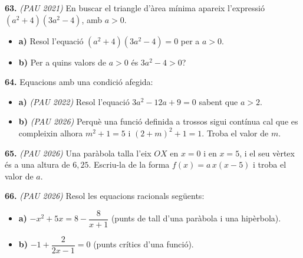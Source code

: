 \documentclass[13pt,a4paper]{extarticle}
\begin{document}
\par\noindent\begin{minipage}{\linewidth}
\textbf{63.} \emph{(PAU 2021)} En buscar el triangle d'àrea mínima apareix l'expressió $(a^2+4)(3a^2-4)$, amb $a>0$.\par

\begin{itemize}[leftmargin=0pt,itemsep=6pt,topsep=4pt,parsep=0pt,label={}]
\item \textbf{a)} Resol l'equació $(a^2+4)(3a^2-4)=0$ per a $a>0$.
\item \textbf{b)} Per a quins valors de $a>0$ és $3a^2-4>0$?
\end{itemize}
\end{minipage}\par\vspace{1.6mm}
\par\noindent\begin{minipage}{\linewidth}
\textbf{64.} Equacions amb una condició afegida:\par

\begin{itemize}[leftmargin=0pt,itemsep=6pt,topsep=4pt,parsep=0pt,label={}]
\item \textbf{a)} \emph{(PAU 2022)} Resol l'equació $3a^2-12a+9=0$ sabent que $a>2$.
\item \textbf{b)} \emph{(PAU 2026)} Perquè una funció definida a trossos sigui contínua cal que es compleixin alhora $m^2+1=5$ i $(2+m)^2+1=1$. Troba el valor de $m$.
\end{itemize}
\end{minipage}\par\vspace{1.6mm}
\par\noindent\begin{minipage}{\linewidth}
\textbf{65.} \emph{(PAU 2026)} Una paràbola talla l'eix $OX$ en $x=0$ i en $x=5$, i el seu vèrtex és a una altura de $6{,}25$. Escriu-la de la forma $f(x)=a\,x(x-5)$ i troba el valor de $a$.\par
\end{minipage}\par\vspace{1.6mm}
\par\noindent\begin{minipage}{\linewidth}
\textbf{66.} \emph{(PAU 2026)} Resol les equacions racionals següents:\par

\begin{itemize}[leftmargin=0pt,itemsep=6pt,topsep=4pt,parsep=0pt,label={}]
\item \textbf{a)} $-x^2+5x=8-\dfrac{8}{x+1}$ (punts de tall d'una paràbola i una hipèrbola).
\item \textbf{b)} $-1+\dfrac{2}{2x-1}=0$ (punts crítics d'una funció).
\end{itemize}
\end{minipage}\par\vspace{1.6mm}
\end{document}
